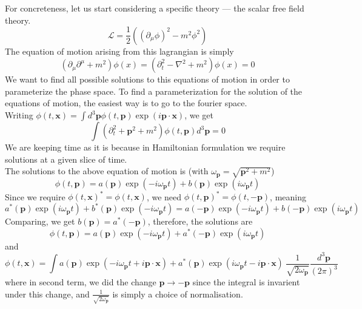 \documentclass[11pt]{article}
\newcommand{\del}{\partial}
\newcommand{\w}{\omega}
\newcommand{\ld}{\mathcal{L}}
\numberwithin{equation}{section}
\begin{document}
    For concreteness, let us start considering a specific theory — the scalar free field theory. 
    \begin{equation}
        \ld = \frac{1}{2}\left((\del_\mu \phi)^2 - m^2\phi^2\right)
    \end{equation}
    The equation of motion arising from this lagrangian is simply 
    \begin{equation}
        (\del_\mu \del^\mu + m^2)\phi(x) = (\del_t^2 - \nabla^2 + m^2)\phi(x) = 0
    \end{equation}
    We want to find all possible solutions to this equations of motion in order to parameterize the phase space. To find a parameterization for the solution of the equations of motion, the easiest way is to go to the fourier space. \\
    Writing \(\phi(t, \textbf{x}) = \int d^3\textbf{p} \phi(t, \textbf{p})\exp(i\textbf{p}\cdot\textbf{x})\), we get 
    \begin{equation}
        \int (\del_t^2 + \textbf{p}^2 + m^2)\phi(t, \textbf{p}) d^3\textbf{p} = 0
    \end{equation}
    We are keeping time as it is because in Hamiltonian formulation we require solutions at a given slice of time. \\
    The solutions to the above equation of motion is (with \(\w_\textbf{p} = \sqrt{\textbf{p}^2 + m^2}\))
    \begin{equation}
        \phi(t,\textbf{p}) = a(\textbf{p})\exp(-i \w_\mathbf{p} t) + b(\textbf{p}) \exp(i \w_\mathbf{p} t)
    \end{equation}
    Since we require \(\phi(t, \textbf{x})^* = \phi(t, \textbf{x})\), we need 
    \(\phi(t, \textbf{p})^* = \phi(t, -\textbf{p})\), meaning
    \begin{equation*}
        a^*(\textbf{p})\exp(i \w_\mathbf{p} t) + b^*(\textbf{p}) \exp(-i \w_\mathbf{p} t) = a(-\textbf{p})\exp(-i \w_\mathbf{p} t) + b(-\textbf{p}) \exp(i \w_\mathbf{p} t)
    \end{equation*}
    Comparing, we get \(b(\textbf{p}) = a^*(-\textbf{p})\), therefore, the solutions are 
    \begin{equation}
        \phi(t, \textbf{p}) = a(\textbf{p}) \exp(-i\w_\textbf{p} t) + a^*(-\textbf{p}) \exp(i\w_\textbf{p} t)
    \end{equation}
    and 
    \begin{equation}
        \phi(t, \textbf{x}) = \int a(\textbf{p}) \exp(-i\w_\textbf{p} t + i\textbf{p}\cdot \textbf{x}) + a^*(\textbf{p}) \exp(i\w_\textbf{p} t - i\textbf{p}\cdot \textbf{x}) ~ \frac{1}{\sqrt{2\w_\textbf{p}}} \frac{d^3 \textbf{p}}{(2\pi)^3} 
    \end{equation}
    where in second term, we did the change \(\textbf{p}\to -\textbf{p}\) since the integral is invarient under this change, and \(\displaystyle\frac{1}{\sqrt{2\w_\textbf{p}}}\) is simply a choice of normalisation.\\
\end{document}

